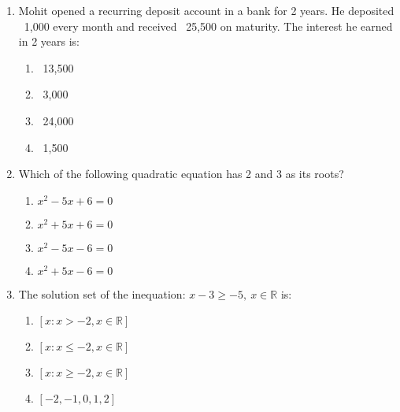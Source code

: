 \begin{enumerate}[label=(\roman*)]

    \item Mohit opened a recurring deposit account in a bank for 2 years. He 
        deposited \rupee~1,000 every month and received \rupee~25,500 on maturity. 
        The interest he earned in 2 years is:

        \begin{multicols}{2}
        \begin{enumerate}[label=(\alph*)]
            \item \rupee~13,500
            \item \rupee~3,000
            \item \rupee~24,000
            \item \rupee~1,500
        \end{enumerate}
        \end{multicols}

    \newpage
    \item Which of the following quadratic equation has 2 and 3 as its roots?

        \begin{multicols}{2}
        \begin{enumerate}[label=(\alph*)]
            \item $x^2 - 5x + 6 = 0$
            \item $x^2 + 5x + 6 = 0$
            \item $x^2 - 5x - 6 = 0$
            \item $x^2 + 5x - 6 = 0$
        \end{enumerate}
        \end{multicols}

    \item The solution set of the inequation: $x-3 \ge -5, \ x \in \mathbb{R}$ is:

        \begin{multicols}{2}
        \begin{enumerate}[label=(\alph*)]
            \item $[x:x > -2, x \in \mathbb{R}]$
            \item $[x:x \le -2, x \in \mathbb{R}]$
            \item $[x:x \ge -2, x \in \mathbb{R}]$
            \item $[-2, -1, 0, 1, 2]$
        \end{enumerate}
        \end{multicols}


\end{enumerate}
